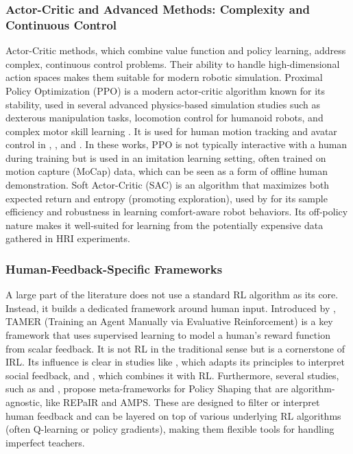 \documentclass[rnd]{mas_proposal}
\begin{document}
\subsubsection{Actor-Critic and Advanced Methods: Complexity and Continuous Control}
Actor-Critic methods, which combine value function and policy learning, address complex, continuous control problems. Their ability to handle high-dimensional action spaces makes them suitable for modern robotic simulation. Proximal Policy Optimization (PPO) is a modern actor-critic algorithm known for its stability, used in several advanced physics-based simulation studies such as dexterous manipulation tasks, locomotion control for humanoid robots, and complex motor skill learning \citep{Escontrela2022, Christen2019}. It is used for human motion tracking and avatar control in \citet{Winkler2022}, \citet{Ye2022}, and \citet{Luo2024}. In these works, PPO is not typically interactive with a human during training but is used in an imitation learning setting, often trained on motion capture (MoCap) data, which can be seen as a form of offline human demonstration. Soft Actor-Critic (SAC) is an algorithm that maximizes both expected return and entropy (promoting exploration), used by \citet{GonzalezSantocildes2024} for its sample efficiency and robustness in learning comfort-aware robot behaviors. Its off-policy nature makes it well-suited for learning from the potentially expensive data gathered in HRI experiments.


\subsubsection{Human-Feedback-Specific Frameworks}
A large part of the literature does not use a standard RL algorithm as its core. Instead, it builds a dedicated framework around human input. Introduced by \citet{BradleyKnox2008}, TAMER (Training an Agent Manually via Evaluative Reinforcement) is a key framework that uses supervised learning to model a human's reward function from scalar feedback. It is not RL in the traditional sense but is a cornerstone of IRL. Its influence is clear in studies like \citet{Lin2020a}, which adapts its principles to interpret social feedback, and \citet{Faulkner2020}, which combines it with RL. Furthermore, several studies, such as \citet{Faulkner2020} and \citet{KesslerFaulkner2021}, propose meta-frameworks for Policy Shaping that are algorithm-agnostic, like REPaIR and AMPS. These are designed to filter or interpret human feedback and can be layered on top of various underlying RL algorithms (often Q-learning or policy gradients), making them flexible tools for handling imperfect teachers.
\end{document}
